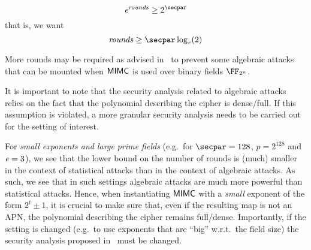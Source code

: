 \[
    \exponent{}^{\rounds} \geq 2^{\secpar}
\]
that is, we want
\[
    \rounds \geq \secpar \log_{\exponent}(2)
\]

\begin{remark}
    More rounds may be required as advised in~\cite{DBLP:conf/asiacrypt/Eichlseder0LORS20} to prevent some algebraic attacks that can be mounted when $\mathsf{MIMC{}}$ is used over binary fields $\FFx{2^n}$.
\end{remark}

It is important to note that the security analysis related to algebraic attacks relies on the fact that the polynomial describing the cipher is dense/full. If this assumption is violated, a more granular security analysis needs to be carried out for the setting of interest.

\begin{notebox}
    For \emph{small exponents and large prime fields} (e.g.~for $\secpar = 128$, $p = 2^{128}$ and $\mathit{e}{} = 3$), we see that the lower bound on the number of rounds is (much) smaller in the context of statistical attacks than in the context of algebraic attacks. As such, we see that in such settings algebraic attacks are much more powerful than statistical attacks. Hence, when instantiating $\mathsf{MIMC{}}$ with a \emph{small} exponent of the form $2^t \pm 1$, it is crucial to make sure that, even if the resulting map is not an APN, the polynomial describing the cipher remains full/dense. Importantly, if the setting is changed (e.g.~to use exponents that are ``big'' w.r.t.~the field size) the security analysis proposed in~\cite{albrecht2016mimc} must be changed.
\end{notebox}
